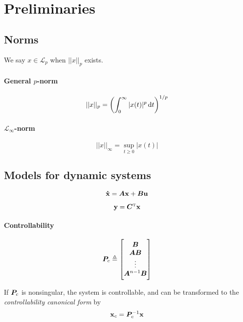 \section{Preliminaries}
\subsection{Norms}
We say $x \in \mathcal{L}_p$ when $||x||_p$ exists.
\paragraph{General $p$-norm}
\begin{equation}
	||x||_p
	=
	\left(
		\int_{0}^{\infty} |x(t)|^p \dif t
	\right)
	^{1/p}
\end{equation}

\paragraph{$\mathcal{L}_\infty$-norm}
\begin{equation}
	||x||_\infty
	=
	\sup_{t \geq 0} |x(t)|
\end{equation}


\subsection{Models for dynamic systems}

\begin{equation}
	\boldsymbol{\mathbf{\dot{x}}}
	=
	\bm{A} \boldsymbol{\mathbf{x}}
	+
	\bm{B} \boldsymbol{\mathbf{u}}
\end{equation}

\begin{equation}
	\boldsymbol{\mathbf{y}}
	=
	\bm{C}^{\scriptscriptstyle \mathrm{T}} \boldsymbol{\mathbf{x}}
\end{equation}

\paragraph{Controllability}
\begin{equation}
	\bm{P}_c
	\triangleq
	\begin{bmatrix}
		\bm{B} \\ \bm{AB} \\ \vdots \\ \bm{A}^{n-1}\bm{B}
	\end{bmatrix}
\end{equation}

If $\bm{P}_c$ is nonsingular, the system is controllable, and can be transformed to the \emph{controllability canonical form} by
\begin{equation}
	\boldsymbol{\mathbf{x}}_c
	=
	\bm{P}_c^{-1} \boldsymbol{\mathbf{x}}
\end{equation}

